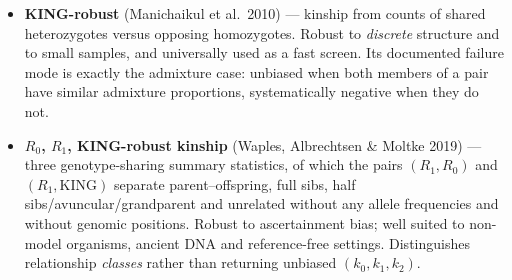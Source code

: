 \documentclass[10pt,a4paper]{article}
\newenvironment{tightitem}{%
  \begin{itemize}\setlength{\itemsep}{1pt}\setlength{\parskip}{0pt}%
  \setlength{\topsep}{3pt}\setlength{\parsep}{0pt}}{\end{itemize}}
\begin{document}
\begin{tightitem}
  \item \textbf{KING-robust} (Manichaikul et al.\ 2010) --- kinship from counts of shared heterozygotes
  versus opposing homozygotes. Robust to \emph{discrete} structure and to small samples, and universally used
  as a fast screen. Its documented failure mode is exactly the admixture case: unbiased when both members of
  a pair have similar admixture proportions, systematically negative when they do not.
  \item \textbf{$R_0$, $R_1$, KING-robust kinship} (Waples, Albrechtsen \& Moltke 2019) --- three
  genotype-sharing summary statistics, of which the pairs $(R_1,R_0)$ and $(R_1,\text{KING})$ separate
  parent--offspring, full sibs, half sibs/avuncular/grandparent and unrelated without any allele frequencies
  and without genomic positions. Robust to ascertainment bias; well suited to non-model organisms, ancient
  DNA and reference-free settings. Distinguishes relationship \emph{classes} rather than returning
  unbiased $(k_0,k_1,k_2)$.
\end{tightitem}
\end{document}
